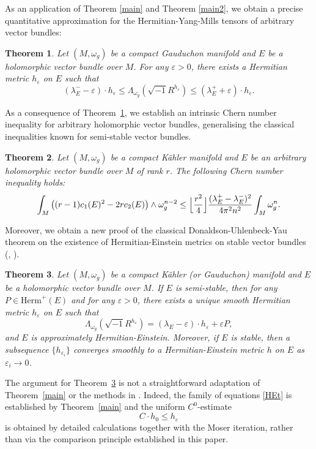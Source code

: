 \documentclass[12pt, reqno]{amsart}
\theoremstyle{plain}
\newtheorem{thm}{Theorem}[section]
\theoremstyle{definition}
\newcommand{\btheorem}{\begin{thm}}
\newcommand{\etheorem}{\end{thm}}
\newcommand{\eps}{\varepsilon}
\newcommand{\beq}{\begin{equation}}
\newcommand{\eeq}{\end{equation}}
\renewcommand{\>}{\rightarrow}
\renewcommand{\>}{\rightarrow}
\newcommand{\smo}{\sqrt{-1}}
\numberwithin{equation}{section} %
\begin{document}
As an application of Theorem \ref{main} and Theorem \ref{main2}, we obtain a precise quantitative approximation for the Hermitian-Yang-Mills tensors of arbitrary vector bundles: 
\btheorem\label{main7}
Let $ (M,\omega_g) $ be a compact Gauduchon manifold and $ E $ be a holomorphic vector bundle over $ M $. For any $ \eps > 0 $, there exists a Hermitian metric $ h_\eps $ on $ E $ such that 
\beq \left(\lambda_E^-- \eps\right) \cdot h_\eps \leq \Lambda_{\omega_g}\left(\smo R^{h_\eps}\right) \leq \left(\lambda_E^++ \eps\right) \cdot h_\eps. \eeq
\etheorem

As a consequence of Theorem~\ref{main7}, we establish an intrinsic Chern number inequality for  arbitrary holomorphic vector bundles, generalising  the classical inequalities known for semi-stable vector bundles.
\btheorem \label{main6}Let $ (M,\omega_g) $ be a compact K\"ahler manifold and $ E $ be an arbitrary holomorphic vector bundle over $ M $ of rank $r$. The following Chern number inequality holds:
\beq\int_M \left((r-1)c_1(E)^2 - 2rc_2(E)\right) \wedge \omega_g^{n-2} \leq \Bigl\lfloor \frac{r^2}{4} \Bigr\rfloor \frac{(\lambda_E^+-\lambda_E^-)^2}{4\pi^2 n^2} \int_M \omega_g^n. \eeq
\etheorem


Moreover, we obtain a new proof of the classical Donaldson-Uhlenbeck-Yau theorem on the existence of  Hermitian-Einstein metrics on stable vector bundles (\cite{Don85,UY86,Don87}, \cite{LY86}).

\btheorem\label{main3}
\label{alternativesemistable}\label{alternativeUBY}
Let $ (M,\omega_g) $ be a compact K\"ahler (or Gauduchon) manifold and $ E $ be a  holomorphic vector bundle over $ M $.
 If $E$ is semi-stable, then for any $ P \in \mathrm{Herm}^+(E) $ and for any $ \eps > 0 $, there exists a unique smooth Hermitian metric $ h_\eps $ on $E$ such that
\beq \Lambda_{\omega_g}\left(\smo R^{h_\eps}\right) = (\lambda_E - \eps)\cdot h_\eps + \eps P,  \label{HEt}\eeq
and $ E $ is approximately Hermitian-Einstein.
Moreover, if $E$ is stable, then a subsequence $\{h_{\eps_i}\}$ converges smoothly to a Hermitian-Einstein metric $h$ on $E$ as $\eps_i\>0$.
\etheorem
\noindent The argument for Theorem~\ref{main3} is not a straightforward adaptation
of Theorem~\ref{main} or the methods in \cite{Don85, UY86, Don87, LY86}. Indeed, the family of equations \eqref{HEt} is established by Theorem~\ref{main} and the uniform $C^0$-estimate
	\begin{equation}
	C \cdot h_0 \le h_\varepsilon
	\end{equation}
	is obtained by detailed calculations together with the Moser iteration,
	rather than via the comparison principle established in this paper.
\end{document}
